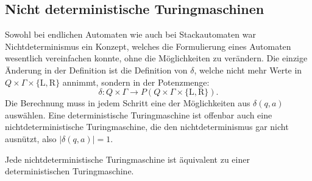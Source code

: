 \subsection{Nicht deterministische Turingmaschinen}
Sowohl bei endlichen Automaten wie auch bei Stackautomaten war
Nichtdeterminismus ein Konzept, welches die Formulierung eines
Automaten wesentlich vereinfachen konnte, ohne die Möglichkeiten
zu verändern. Die einzige Änderung in der Definition ist die
Definition von $\delta$, welche nicht mehr Werte in
$Q\times \Gamma\times\{\text{L},\text{R}\}$ annimmt, sondern
in der Potenzmenge:
\[
\delta\colon Q\times\Gamma\to
P(Q\times \Gamma\times\{\text{L},\text{R}\}).
\]
Die Berechnung muss in jedem Schritt eine der Möglichkeiten
aus $\delta(q,a)$ auswählen.
Eine deterministische Turingmaschine ist offenbar auch eine
nichtdeterministische Turingmaschine, die den nichtdeterminismus
gar nicht ausnützt, also $|\delta(q,a)|=1$.

\begin{satz}
\label{nichtdeterministischeturingmaschine}
Jede nichtdeterministische Turingmaschine ist äquivalent zu einer
deterministischen Turingmaschine.
\end{satz}


